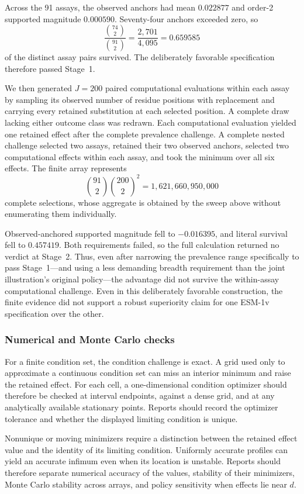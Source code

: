 \documentclass[11pt]{article}
\theoremstyle{remark}
\begin{document}
Across the 91 assays, the observed anchors had mean $0.022877$ and order-2
supported magnitude $0.000590$. Seventy-four anchors exceeded zero, so
\[
\frac{\binom{74}{2}}{\binom{91}{2}}
=
\frac{2{,}701}{4{,}095}
=
0.659585
\]
of the distinct assay pairs survived. The deliberately favorable
specification therefore passed Stage~1.

We then generated $J=200$ paired computational evaluations within each assay
by sampling its observed number of residue positions with replacement and
carrying every retained substitution at each selected position. A complete
draw lacking either outcome class was redrawn. Each computational evaluation
yielded one retained effect after the complete prevalence challenge. A
complete nested challenge selected two assays, retained their two observed
anchors, selected two computational effects within each assay, and took the
minimum over all six effects. The finite array represents
\[
\binom{91}{2}\binom{200}{2}^{2}
=1{,}621{,}660{,}950{,}000
\]
complete selections, whose aggregate is obtained by the sweep above without
enumerating them individually.

Observed-anchored supported magnitude fell to $-0.016395$, and literal
survival fell to $0.457419$. Both requirements failed, so the full calculation
returned no verdict at Stage~2. Thus, even after narrowing the prevalence
range specifically to pass Stage~1---and using a less demanding breadth
requirement than the joint illustration's original policy---the advantage did not survive
the within-assay computational challenge. Even in this deliberately favorable
construction, the finite evidence did not support a robust superiority claim
for one ESM-1v specification over the other.

\subsubsection{Numerical and Monte Carlo checks}

For a finite condition set, the condition challenge is exact. A grid used only
to approximate a continuous condition set can miss an interior minimum and
raise the retained effect. For each cell, a one-dimensional condition optimizer
should therefore be checked at interval endpoints, against a dense grid, and
at any analytically available stationary points. Reports should record the
optimizer tolerance and whether the displayed limiting condition is unique.

Nonunique or moving minimizers require a distinction between the retained
effect value and the identity of its limiting condition. Uniformly accurate
profiles can yield an accurate infimum even when its location is unstable.
Reports should therefore separate numerical accuracy of the values, stability
of their minimizers, Monte Carlo stability across arrays, and policy
sensitivity when effects lie near $d$.
\end{document}
